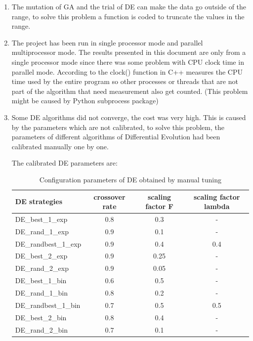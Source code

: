 \documentclass[12pt]{article}
\begin{document}
    \begin{enumerate}[label=\arabic*)]
    \item The mutation of GA and the trial of DE can make the data go outside of the range, to solve this problem a function is coded to truncate the values in the range.
    \item The project has been run in single processor mode and parallel multiprocessor mode. The results presented in this document are only from a single processor mode since there was some problem with CPU clock time in parallel mode. According to \cite{clock} the clock() function in C++ measures the CPU time used by the entire program so other processes or threads that are not part of the algorithm that need measurement also get counted. (This problem might be caused by Python subprocess package) 
    \item Some DE algorithms did not converge, the cost was very high. This is caused by the parameters which are not calibrated, to solve this problem, the parameters of different algorithms of Differential Evolution had been calibrated manually one by one.
    
    The calibrated DE parameters are:
\begin{table}[H]    
\centering
\small 
\begin{tabular}{lccc}

\hline
DE strategies & crossover rate& scaling factor F& scaling factor lambda\\
\hline 
DE\_best\_1\_exp & 0.8 &    0.3&    - \\
DE\_rand\_1\_exp& 0.9&    0.1&    - \\
DE\_randbest\_1\_exp& 0.9&    0.4&    0.4 \\
DE\_best\_2\_exp& 0.9&    0.25&    - \\
DE\_rand\_2\_exp& 0.9&    0.05&    - \\
DE\_best\_1\_bin& 0.6&    0.5&    - \\
DE\_rand\_1\_bin& 0.8&    0.2&    - \\
DE\_randbest\_1\_bin& 0.7&    0.5&    0.5\\
DE\_best\_2\_bin& 0.8&    0.4&    - \\
DE\_rand\_2\_bin& 0.7&    0.1&    - \\
\hline 
\end{tabular} 
\caption{Configuration parameters of DE obtained by manual tuning} 
\end{table}




\end{enumerate}
\end{document}
